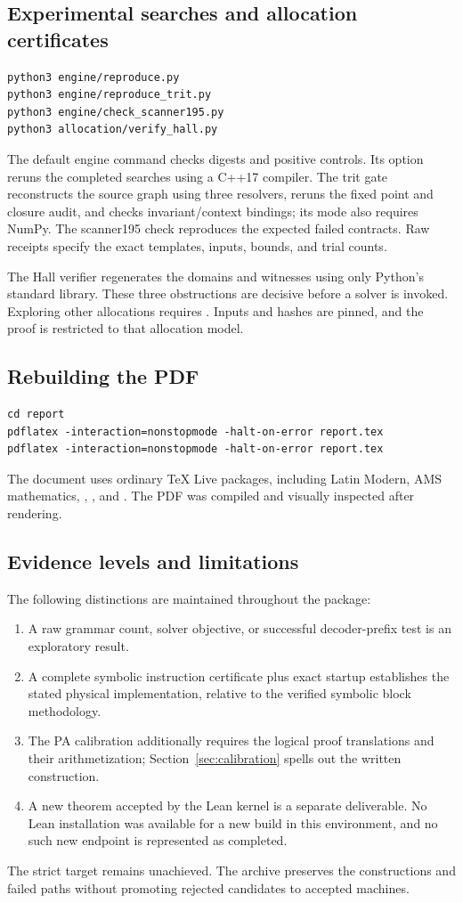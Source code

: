 \subsection{Experimental searches and allocation certificates}
\begin{lstlisting}
python3 engine/reproduce.py
python3 engine/reproduce_trit.py
python3 engine/check_scanner195.py
python3 allocation/verify_hall.py
\end{lstlisting}
The default engine command checks digests and positive controls. Its  option reruns the completed searches using a C++17 compiler. The trit gate reconstructs the source graph using three resolvers, reruns the fixed point and closure audit, and checks invariant/context bindings; its  mode also requires NumPy. The scanner195 check reproduces the expected failed contracts. Raw receipts specify the exact templates, inputs, bounds, and trial counts.

The Hall verifier regenerates the domains and witnesses using only Python's standard library. These three obstructions are decisive before a solver is invoked. Exploring other allocations requires . Inputs and hashes are pinned, and the proof is restricted to that allocation model.

\subsection{Rebuilding the PDF}
\begin{lstlisting}
cd report
pdflatex -interaction=nonstopmode -halt-on-error report.tex
pdflatex -interaction=nonstopmode -halt-on-error report.tex
\end{lstlisting}
The document uses ordinary TeX Live packages, including Latin Modern, AMS mathematics, , , and . The PDF was compiled and visually inspected after rendering.

\subsection{Evidence levels and limitations}
The following distinctions are maintained throughout the package:
\begin{enumerate}
\item A raw grammar count, solver objective, or successful decoder-prefix test is an exploratory result.
\item A complete symbolic instruction certificate plus exact startup establishes the stated physical implementation, relative to the verified symbolic block methodology.
\item The PA calibration additionally requires the logical proof translations and their arithmetization; Section~\ref{sec:calibration} spells out the written construction.
\item A new theorem accepted by the Lean kernel is a separate deliverable. No Lean installation was available for a new build in this environment, and no such new endpoint is represented as completed.
\end{enumerate}
The strict target remains unachieved. The archive preserves the constructions and failed paths without promoting rejected candidates to accepted machines.
